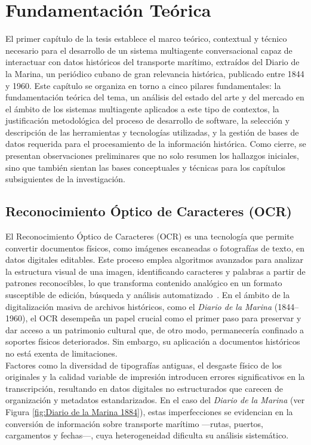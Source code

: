 \chapter{Fundamentación Teórica}
\label{chap:chapter1}

El primer capítulo de la tesis establece el marco teórico, contextual y técnico necesario para el desarrollo de un sistema multiagente conversacional capaz de interactuar con datos históricos del transporte marítimo, extraídos del Diario de la Marina, un periódico cubano de gran relevancia histórica, publicado entre 1844 y 1960. Este capítulo se organiza en torno a cinco pilares fundamentales: la fundamentación teórica del tema, un análisis del estado del arte y del mercado en el ámbito de los sistemas multiagente aplicados a este tipo de contextos, la justificación metodológica del proceso de desarrollo de software, la selección y descripción de las herramientas y tecnologías utilizadas, y la gestión de bases de datos requerida para el procesamiento de la información histórica. Como cierre, se presentan observaciones preliminares que no solo resumen los hallazgos iniciales, sino que también sientan las bases conceptuales y técnicas para los capítulos subsiguientes de la investigación.

\section{Reconocimiento Óptico de Caracteres (OCR)}\label{seq_1}

El Reconocimiento Óptico de Caracteres (OCR) es una tecnología que permite convertir documentos físicos, como imágenes escaneadas o fotografías de texto, en datos digitales editables. Este proceso emplea algoritmos avanzados para analizar la estructura visual de una imagen, identificando caracteres y palabras a partir de patrones reconocibles, lo que transforma contenido analógico en un formato susceptible de edición, búsqueda y análisis automatizado~\cite{piryani2025multilocraqa}. En el ámbito de la digitalización masiva de archivos históricos, como el \textit{Diario de la Marina} (1844–1960), el OCR desempeña un papel crucial como el primer paso para preservar y dar acceso a un patrimonio cultural que, de otro modo, permanecería confinado a soportes físicos deteriorados.
Sin embargo, su aplicación a documentos históricos no está exenta de limitaciones.\\ 
Factores como la diversidad de tipografías antiguas, el desgaste físico de los originales y la calidad variable de impresión introducen errores significativos en la transcripción, resultando en datos digitales no estructurados que carecen de organización y metadatos estandarizados. En el caso del \textit{Diario de la Marina} (ver Figura \ref{fig:Diario de la Marina 1884}), estas imperfecciones se evidencian en la conversión de información sobre transporte marítimo —rutas, puertos, cargamentos y fechas—, cuya heterogeneidad dificulta su análisis sistemático.

